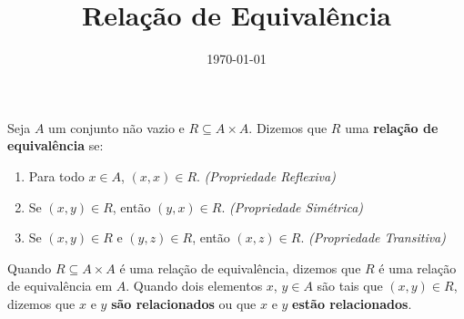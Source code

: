 \documentclass{beamer}
\title{Rela\c{c}\~ao de Equival\^encia}
\author[\autor]{\autor}
\institute[\instituto]{\instituto}
\date{\today}
\begin{document}
    \begin{frame}
        \maketitle
    \end{frame}


    \begin{frame}
        \begin{definicao}
            Seja $A$ um conjunto n{\~a}o vazio \pause e $R\subseteq A \times A$. \pause Dizemos que $R$  uma \textbf{rela{\c c}{\~a}o de equival{\^e}ncia} se:\pause
            \begin{enumerate}[label={\roman*})]
                \item Para todo $x \in A$, \pause $(x,x) \in R$. \pause \textit{(Propriedade Reflexiva)}\pause
                \item Se $(x, y) \in R$, \pause ent\~ao $(y, x) \in R$. \pause \textit{(Propriedade Sim\'etrica)}\pause
                \item Se $(x, y) \in R$ \pause e $(y, z) \in R$, \pause ent\~ao $(x, z)\in R$. \pause \textit{(Propriedade Transitiva)}\pause
            \end{enumerate}
        \end{definicao}

        Quando $R\subseteq A \times A$ {\'e} uma rela{\c c}{\~a}o de equival{\^e}ncia, \pause dizemos que $R$ {\'e} uma rela{\c c}{\~a}o de equival{\^e}ncia em $A$. \pause Quando dois elementos $x$, $y \in A$ \pause s{\~a}o tais que $(x,y) \in R$, \pause dizemos que $x$ e $y$ \textbf{s{\~a}o relacionados} \pause ou que $x$ e $y$ \textbf{est\~ao relacionados}.\pause
    \end{frame}
\end{document}
